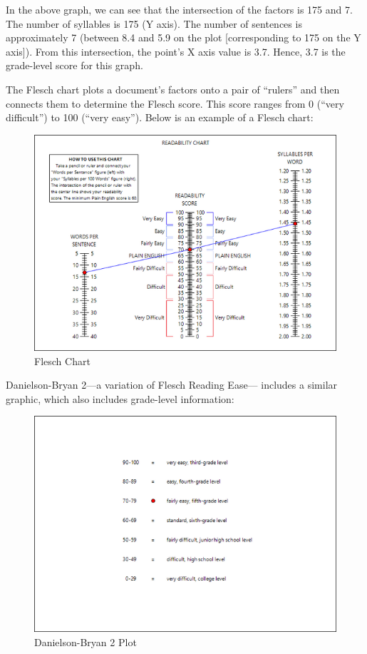 \documentclass[
]{book}
\theoremstyle{definition}
\theoremstyle{definition}
\theoremstyle{definition}
\theoremstyle{definition}
\theoremstyle{remark}
\begin{document}
In the above graph, we can see that the intersection of the factors is 175 and 7. The number of syllables is 175 (Y axis). The number of sentences is approximately 7 (between 8.4 and 5.9 on the plot {[}corresponding to 175 on the Y axis{]}). From this intersection, the point's X axis value is 3.7. Hence, 3.7 is the grade-level score for this graph.

The Flesch chart plots a document's factors onto a pair of ``rulers'' and then connects them to determine the Flesch score. This score ranges from 0 (``very difficult'') to 100 (``very easy''). Below is an example of a Flesch chart:

\begin{figure}[H]

{\centering \includegraphics[width=0.75\linewidth,]{Images/FleschChart} 

}

\caption{Flesch Chart}\label{fig:fleschChart2}
\end{figure}

Danielson-Bryan 2---a variation of Flesch Reading Ease--- includes a similar graphic, which also includes grade-level information:

\begin{figure}[H]

{\centering \includegraphics[width=0.75\linewidth,]{Images/DB2Plot} 

}

\caption{Danielson-Bryan 2 Plot}\label{fig:db2Plot2}
\end{figure}
\end{document}
